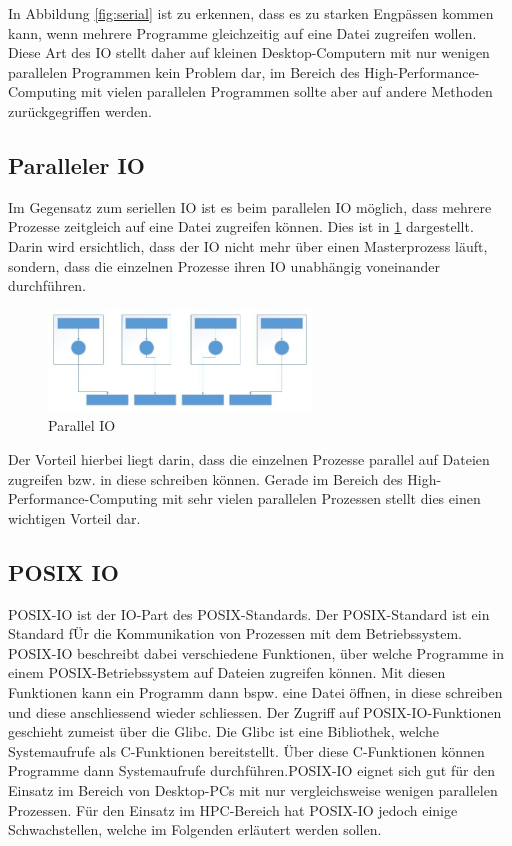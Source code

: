 In Abbildung \ref{fig:serial} ist zu erkennen, dass es zu starken Engp\"assen kommen kann, wenn mehrere Programme gleichzeitig auf eine Datei zugreifen wollen. Diese Art des IO stellt daher auf kleinen Desktop-Computern mit nur wenigen parallelen Programmen kein Problem dar, im Bereich des High-Performance-Computing mit vielen parallelen Programmen sollte aber auf andere Methoden zur\"uckgegriffen werden.\cite{Cazes.26.09.2013}

\subsection{Paralleler IO}
Im Gegensatz zum seriellen IO ist es beim parallelen IO m\"oglich, dass mehrere Prozesse zeitgleich auf eine Datei zugreifen k\"onnen. Dies ist in \ref{fig:parallel} dargestellt. Darin wird ersichtlich, dass der IO nicht mehr \"uber einen Masterprozess l\"auft, sondern, dass die einzelnen Prozesse ihren IO unabh\"angig voneinander durchf\"uhren.
\begin{figure}[h]
	\centering
	\includegraphics[width=7cm]{fig/ParallelIO.jpg}
	\caption{Parallel IO \cite{Cazes.26.09.2013}}
	\label{fig:parallel}
\end{figure}
Der Vorteil hierbei liegt darin, dass die einzelnen Prozesse parallel auf Dateien zugreifen bzw. in diese schreiben k\"onnen. Gerade im Bereich des High-Performance-Computing mit sehr vielen parallelen Prozessen stellt dies einen wichtigen Vorteil dar.\cite{Cazes.26.09.2013}
\subsection{POSIX IO}
POSIX-IO ist der IO-Part des POSIX-Standards. Der POSIX-Standard ist ein Standard f\"Ur die Kommunikation von Prozessen mit dem Betriebssystem. POSIX-IO beschreibt dabei verschiedene Funktionen, \"uber welche Programme in einem POSIX-Betriebssystem auf Dateien zugreifen k\"onnen. Mit diesen Funktionen kann ein Programm dann bspw. eine Datei \"offnen, in diese schreiben und diese anschliessend wieder schliessen. Der Zugriff auf POSIX-IO-Funktionen geschieht zumeist \"uber die Glibc. Die Glibc ist eine Bibliothek, welche Systemaufrufe als C-Funktionen bereitstellt. \"Uber diese C-Funktionen k\"onnen Programme dann Systemaufrufe durchf\"uhren.\newline POSIX-IO eignet sich gut f\"ur den Einsatz im Bereich von Desktop-PCs mit nur vergleichsweise wenigen parallelen Prozessen. F\"ur den Einsatz im HPC-Bereich hat POSIX-IO jedoch einige Schwachstellen, welche im Folgenden erl\"autert werden sollen.

